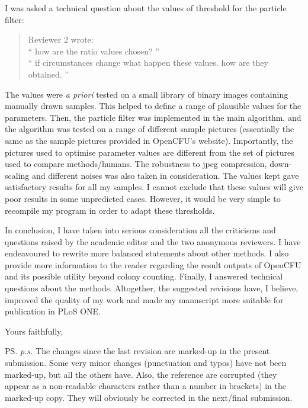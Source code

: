 \documentclass{letter}
\begin{document}
\begin{letter}{}
I was asked a technical question about 
the values of threshold for the particle filter:
\begin{quote}
Reviewer 2 wrote:\\
``  how are the ratio values chosen? ''\\
``  if circumstances change what happen these values. how are they obtained. ''
\end{quote}
The values were \emph{a priori} tested on a small library of binary images containing
manually drawn samples. This helped to define a range of plausible values for the parameters. 
Then, the particle filter was implemented in the main algorithm,
and the algorithm was tested on a range of different sample pictures 
(essentially the same as the sample pictures provided in OpenCFU's website). 
Importantly, the pictures
used to optimise parameter values 
are different from the set of pictures used to compare methods/humans.
The robustness to jpeg compression, down-scaling and different noises was also taken in consideration.
The values kept gave satisfactory results for all my samples.
I cannot exclude that these values will 
give poor results
in some unpredicted cases.
However, it would be very simple to recompile my program in order to adapt these thresholds.

In conclusion, I have taken into serious consideration all the criticisms
and questions raised by the academic editor and the two anonymous reviewers.
I have endeavoured to rewrite more balanced statements about other methods.
I also provide 
more information
to the reader regarding the result outputs
of OpenCFU and its possible utility 
beyond colony counting.
Finally, I answered technical questions about the methods.
Altogether, the suggested revisions have, I believe, improved the quality of my
work and made my manuscript more suitable for publication in PLoS ONE.


\closing{Yours faithfully,
}
\ps{\emph{p.s.} The changes since the last revision 
are marked-up in the present submission.
Some very minor changes (punctuation and typos) have not been marked-up,
 but all the others have.
Also, the reference are corrupted (they appear as a non-readable
characters rather than a number in brackets) in the marked-up copy.
They will obviously be corrected in the next/final submission.
}

\end{letter}
\end{document}

